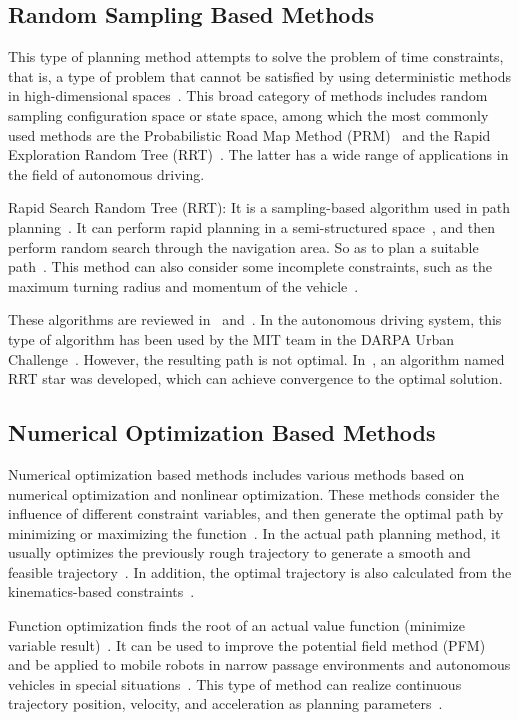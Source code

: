\documentclass[conference]{IEEEtran}
\begin{document}
\subsection{Random Sampling Based Methods}
This type of planning method attempts to solve the problem of time constraints, that is, a type of problem that cannot be satisfied by using deterministic methods in high-dimensional spaces~\cite{Brian2016}. This broad category of methods includes random sampling configuration space or state space, among which the most commonly used methods are the Probabilistic Road Map Method (PRM)~\cite{kavraki1996probabilistic} and the Rapid Exploration Random Tree (RRT)~\cite{lavalle2001randomized}. The latter has a wide range of applications in the field of autonomous driving.

Rapid Search Random Tree (RRT): It is a sampling-based algorithm used in path planning~\cite{karaman2011sampling}. It can perform rapid planning in a semi-structured space~\cite{lavalle2001randomized}, and then perform random search through the navigation area. So as to plan a suitable path~\cite{karaman2011sampling}. This method can also consider some incomplete constraints, such as the maximum turning radius and momentum of the vehicle~\cite{karaman2011sampling}.

These algorithms are reviewed in~\cite{elbanhawi2014sampling} and~\cite{karaman2011sampling}. In the autonomous driving system, this type of algorithm has been used by the MIT team in the DARPA Urban Challenge~\cite{Kuwata2009}.  However, the resulting path is not optimal. In~\cite{karaman2010optimal}, an algorithm named RRT star was developed, which can achieve convergence to the optimal solution.

\subsection{Numerical Optimization Based Methods}
Numerical optimization based methods includes various methods based on numerical optimization and nonlinear optimization. These methods consider the influence of different constraint variables, and then generate the optimal path by minimizing or maximizing the function~\cite{Brian2016}. In the actual path planning method, it usually optimizes the previously rough trajectory to generate a smooth and feasible trajectory~\cite{dolgov2010path}. In addition, the optimal trajectory is also calculated from the kinematics-based constraints~\cite{ziegler2014making}.

Function optimization finds the root of an actual value function (minimize variable result)~\cite{Brian2016}. It can be used to improve the potential field method (PFM) and be applied to mobile robots in narrow passage environments and autonomous vehicles in special situations~\cite{Brian2016}. This type of method can realize continuous trajectory position, velocity, and acceleration as planning parameters~\cite{Brian2016}.
\end{document}
